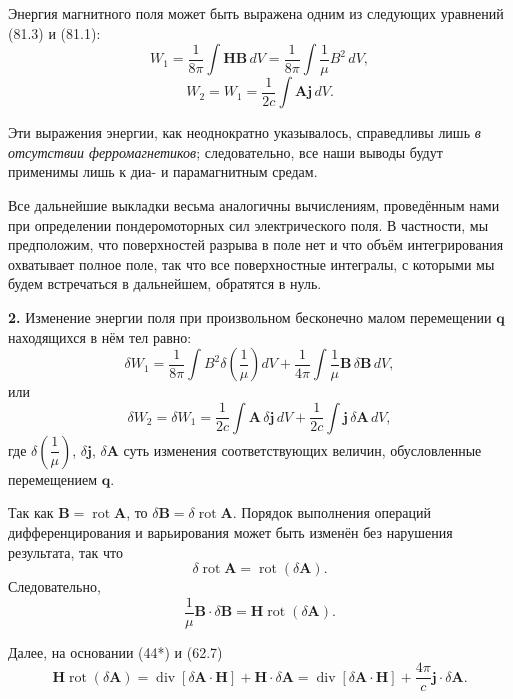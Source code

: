 \documentclass[a4paper,10pt]{article}
\newcommand{\redtext}[1]{\textcolor{redcolor}{#1}}
\begin{document}
Энергия магнитного поля может быть выражена одним из следующих
уравнений (81.3) и (81.1):
$$
    W_1 = \frac{1}{8\pi}\int \mathbf{H}\mathbf{B}\,dV
        = \frac{1}{8\pi}\int \frac{1}{\mu}B^2\,dV,
$$
$$
    W_2 = W_1 = \frac{1}{2c}\int \mathbf{A}\mathbf{j}\,dV.
$$

Эти выражения энергии, как неоднократно указывалось, справедливы лишь
\textit{в отсутствии ферромагнетиков}; следовательно, все наши выводы
будут применимы лишь к диа- и парамагнитным средам.

Все дальнейшие выкладки весьма аналогичны вычислениям, проведённым
нами при определении пондеромоторных сил электрического поля.
В частности, \redtext{мы предположим, что поверхностей разрыва в поле нет и
что объём интегрирования охватывает полное поле, так что все
поверхностные интегралы, с которыми мы будем встречаться в дальнейшем,
обратятся в нуль}.

\textbf{2.} Изменение энергии поля при произвольном бесконечно малом
перемещении $\mathbf{q}$ находящихся в нём тел равно:
$$
    \delta W_1 = \frac{1}{8\pi}\int B^2\delta\!\left(\frac{1}{\mu}\right)dV
               + \frac{1}{4\pi}\int \frac{1}{\mu}\mathbf{B}\,\delta\mathbf{B}\,dV,
$$
или
$$
    \delta W_2 = \delta W_1 = \frac{1}{2c}\int \mathbf{A}\,\delta\mathbf{j}\,dV
               + \frac{1}{2c}\int \mathbf{j}\,\delta\mathbf{A}\,dV,
$$
где $\delta\!\left(\dfrac{1}{\mu}\right)$, $\delta\mathbf{j}$,
$\delta\mathbf{A}$ суть изменения соответствующих величин, обусловленные
перемещением $\mathbf{q}$.

Так как $\mathbf{B} = \operatorname{rot}\mathbf{A}$, то
$\delta\mathbf{B} = \delta\operatorname{rot}\mathbf{A}$. Порядок
выполнения операций дифференцирования и варьирования может быть изменён
без нарушения результата, так что
$$
    \delta\operatorname{rot}\mathbf{A} = \operatorname{rot}(\delta\mathbf{A}).
$$
Следовательно,
$$
    \frac{1}{\mu}\mathbf{B}\cdot\delta\mathbf{B}
    = \mathbf{H}\operatorname{rot}(\delta\mathbf{A}).
$$





Далее, на основании (44*) и (62.7)
$$
    \mathbf{H}\operatorname{rot}(\delta\mathbf{A})
    = \operatorname{div}[\delta\mathbf{A}\cdot\mathbf{H}]
    + \mathbf{H}\cdot\delta\mathbf{A}
    = \operatorname{div}[\delta\mathbf{A}\cdot\mathbf{H}]
    + \frac{4\pi}{c}\mathbf{j}\cdot\delta\mathbf{A}.
$$
\end{document}

